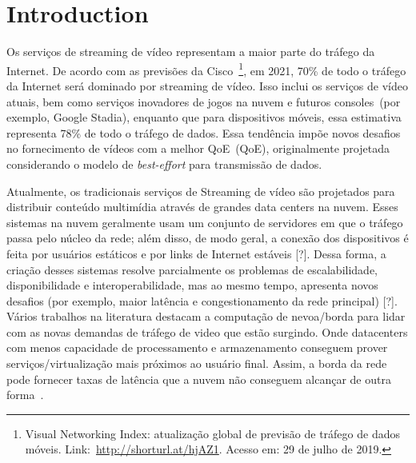 \section{Introduction}
\label{ch:introduction}



Os serviços de streaming de vídeo representam a maior parte do tráfego da Internet. De acordo com as previsões da Cisco~\footnote{Visual Networking Index: atualização global de previsão de tráfego de dados móveis. Link:~\url{http://shorturl.at/hjAZ1}. Acesso em: 29 de julho de 2019.}, em 2021, 70\% de todo o tráfego da Internet será dominado por streaming de vídeo. Isso inclui os serviços de vídeo atuais, bem como serviços inovadores de jogos na nuvem e futuros consoles~(por exemplo, Google Stadia), enquanto que para dispositivos móveis, essa estimativa representa 78\% de todo o tráfego de dados. Essa tendência impõe novos desafios no fornecimento de vídeos com a melhor \acl{QoE}~(QoE), originalmente projetada considerando o modelo de \textit{best-effort} para transmissão de dados.

Atualmente, os tradicionais serviços de Streaming de vídeo são projetados para distribuir conteúdo multimídia através de grandes data centers na nuvem. Esses sistemas na nuvem geralmente usam um conjunto de servidores em que o tráfego passa pelo núcleo da rede; além disso, de modo geral, a conexão dos dispositivos é feita por usuários estáticos e por links de Internet estáveis [?]. Dessa forma, a criação desses sistemas resolve parcialmente os problemas de escalabilidade, disponibilidade e interoperabilidade, mas ao mesmo tempo, apresenta novos desafios (por exemplo, maior latência e congestionamento da rede principal) [?]. Vários trabalhos na literatura destacam a computação de nevoa/borda para lidar com as novas demandas de tráfego de video que estão surgindo. Onde datacenters com menos capacidade de processamento e armazenamento conseguem prover serviços/virtualização mais próximos ao usuário final. Assim, a borda da rede pode fornecer taxas de latência que a nuvem não conseguem alcançar de outra forma~\cite{rosarioSENSORS2018, JS}.

